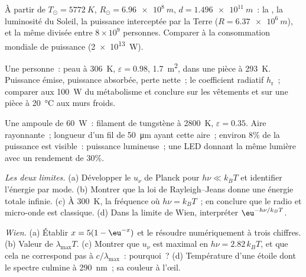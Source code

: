 \begin{exercise}[$\star$]\label{exo:b2:thermal-radiation:2}
À partir de $T_\odot = \qty{5772}{K}$, $R_\odot = \qty{6.96e8}{m}$, $d = \qty{1.496e11}{m}$~:
la , la luminosité du Soleil, la puissance interceptée par la
Terre ($R = \qty{6.37e6}{m}$), et la même divisée entre $8 \times 10^9$
personnes. Comparer à la consommation mondiale de puissance (\qty{2e13}{W}).
\end{exercise}

\begin{exercise}[$\star$]\label{exo:b2:thermal-radiation:3}
Une personne~: peau à \qty{306}{K}, $\varepsilon = 0.98$, \qty{1.7}{m^2}, dans une
pièce à \qty{293}{K}. Puissance émise, puissance absorbée, perte nette~; le
coefficient radiatif $h_{\text{r}}$~; comparer aux \qty{100}{W} du
métabolisme et conclure sur les vêtements et sur une pièce à \qty{20}{\celsius}
aux murs froids.
\end{exercise}

\begin{exercise}[$\star$]\label{exo:b2:thermal-radiation:4}
Une ampoule de \qty{60}{W}~: filament de tungstène à \qty{2800}{K}, $\varepsilon = 0.35$.
Aire rayonnante~; longueur d'un fil de \qty{50}{\micro m} ayant cette aire~;
environ $8\%$ de la puissance est visible~: puissance lumineuse~; une LED donnant la
même lumière avec un rendement de $30\%$.
\end{exercise}

\begin{exercise}[$\star\star$]\label{exo:b2:thermal-radiation:5}
\emph{Les deux limites.} (a) Développer le $u_\nu$ de Planck pour $h\nu \ll k_BT$ et
identifier l'énergie par mode. (b) Montrer que la loi de Rayleigh--Jeans
donne une énergie totale infinie. (c) À \qty{300}{K}, la fréquence où
$h\nu = k_BT$~; en conclure que le  radio et micro-onde est
classique. (d) Dans la limite de Wien, interpréter $\eu^{-h\nu/k_BT}$.
\end{exercise}

\begin{exercise}[$\star\star$]\label{exo:b2:thermal-radiation:6}
\emph{Wien.} (a) Établir $x = 5(1 - \eu^{-x})$ et le résoudre numériquement
à trois chiffres. (b) Valeur de $\lambda_{\max}T$. (c) Montrer que $u_\nu$
est maximal en $h\nu = 2.82\,k_BT$, et que cela ne correspond pas à
$c/\lambda_{\max}$~: pourquoi~? (d) Température d'une étoile dont le spectre
culmine à \qty{290}{nm}~; sa couleur à l'œil.
\end{exercise}

